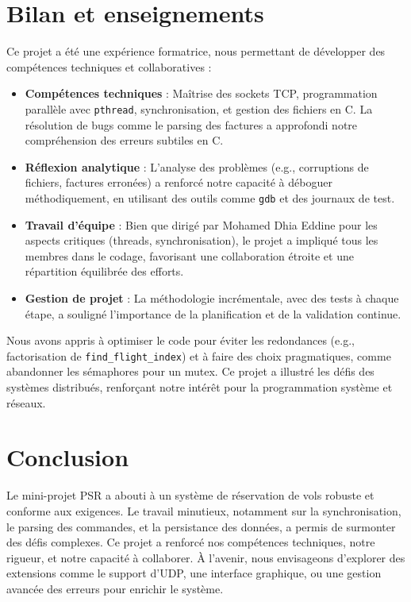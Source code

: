 \documentclass[a4paper,12pt]{article}
\begin{document}
\section{Bilan et enseignements}
Ce projet a été une expérience formatrice, nous permettant de développer des compétences techniques et collaboratives :
\begin{itemize}
    \item \textbf{Compétences techniques} : Maîtrise des sockets TCP, programmation parallèle avec \texttt{pthread}, synchronisation, et gestion des fichiers en C. La résolution de bugs comme le parsing des factures a approfondi notre compréhension des erreurs subtiles en C.
    \item \textbf{Réflexion analytique} : L’analyse des problèmes (e.g., corruptions de fichiers, factures erronées) a renforcé notre capacité à déboguer méthodiquement, en utilisant des outils comme \texttt{gdb} et des journaux de test.
    \item \textbf{Travail d’équipe} : Bien que dirigé par Mohamed Dhia Eddine pour les aspects critiques (threads, synchronisation), le projet a impliqué tous les membres dans le codage, favorisant une collaboration étroite et une répartition équilibrée des efforts.
    \item \textbf{Gestion de projet} : La méthodologie incrémentale, avec des tests à chaque étape, a souligné l’importance de la planification et de la validation continue.
\end{itemize}
Nous avons appris à optimiser le code pour éviter les redondances (e.g., factorisation de \texttt{find_flight_index}) et à faire des choix pragmatiques, comme abandonner les sémaphores pour un mutex. Ce projet a illustré les défis des systèmes distribués, renforçant notre intérêt pour la programmation système et réseaux.

\section{Conclusion}
Le mini-projet PSR a abouti à un système de réservation de vols robuste et conforme aux exigences. Le travail minutieux, notamment sur la synchronisation, le parsing des commandes, et la persistance des données, a permis de surmonter des défis complexes. Ce projet a renforcé nos compétences techniques, notre rigueur, et notre capacité à collaborer. À l’avenir, nous envisageons d’explorer des extensions comme le support d’UDP, une interface graphique, ou une gestion avancée des erreurs pour enrichir le système.
\end{document}
